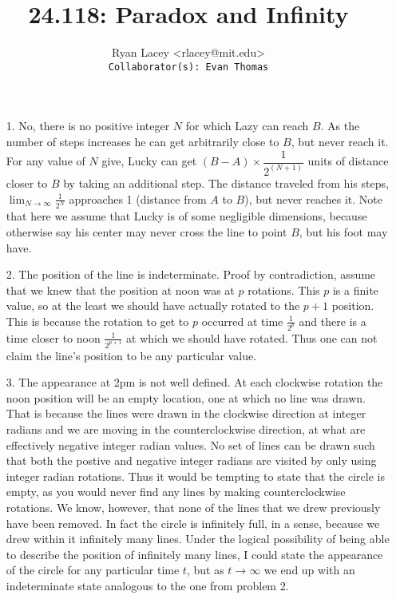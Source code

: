 \documentclass{article}
\begin{document}

\title{24.118: Paradox and Infinity}
\author{
  Ryan Lacey <rlacey@mit.edu>\\
  \footnotesize \texttt{Collaborator(s): Evan Thomas}
}
        
\maketitle
        


\begin{enumerate}
\item[1.]
	No, there is no positive integer $N$ for which Lazy can reach  $B$. As the number of steps increases he can get arbitrarily close to $B$, but never reach it. For any value of $N$ give, Lucky can get $(B-A) \times \dfrac{1}{2^{(N+1)}}$ units of distance closer to $B$ by taking an additional step. The distance traveled from his steps, $\displaystyle\lim_{N \to \infty} \frac{1}{2^N}$ approaches 1 (distance from $A$ to $B$), but never reaches it. Note that here we assume that Lucky is of some negligible dimensions, because otherwise say his center may never cross the line to point $B$, but his foot may have.

\bigskip

\item[2.]
	The position of the line is indeterminate. Proof by contradiction, assume that we knew that the position at noon was at $p$ rotations. This $p$ is a finite value, so at the least we should have actually rotated to the $p+1$ position. This is because the rotation to get to $p$ occurred at time $\frac{1}{2^p}$ and there is a time closer to noon $\frac{1}{2^{p+1}}$ at which we should have rotated. Thus one can not claim the line's position to be any particular value. 

\bigskip

\item[3.]
	The appearance at 2pm is not well defined. At each clockwise rotation the noon position will be an empty location, one at which no line was drawn. That is because the lines were drawn in the clockwise direction at integer radians and we are moving in the counterclockwise direction, at what are effectively negative integer radian values. No set of lines can be drawn such that both the postive and negative integer radians are visited by only using integer radian rotations. Thus it would be tempting to state that the circle is empty, as you would never find any lines by making counterclockwise rotations. We know, however, that none of the lines that we drew previously have been removed. In fact the circle is infinitely full, in a sense, because we drew within it infinitely many lines. Under the logical possibility of being able to describe the position of infinitely many lines, I could state the appearance of the circle for any particular time $t$, but as $t\rightarrow\infty$ we end up with an indeterminate state analogous to the one from problem 2. 


\end{enumerate}
\end{document}

